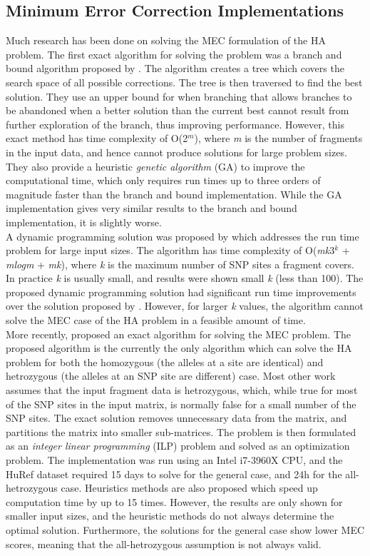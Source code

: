 \documentclass[10pt,twocolumn]{witseiepaper}
\newcommand{\K}{\textit{k }}
\newcommand{\M}{\textit{m }}
\begin{document}
\subsection{ Minimum Error Correction Implementations } \label{sec:mecimp}

Much research has been done on solving the MEC formulation of the HA problem. The first exact algorithm for
solving the problem was a branch and bound algorithm proposed by \cite{wang:2005}. The algorithm creates a
tree which covers the search space of all possible corrections. The tree is then traversed to find the best
solution. They use an upper bound for when branching that allows branches to be abandoned when a better
solution than the current best cannot result from further exploration of the branch, thus improving
performance. However, this exact method has time complexity of O(2$^{\textit{m}}$), where \M is the
number of fragments in the input data, and hence cannot produce solutions for large problem sizes. They also 
provide a heuristic \textit{genetic algorithm} (GA) to improve the computational time, which only requires 
run times up to three orders of magnitude faster than the branch and bound implementation. While the GA
implementation gives very similar results to the branch and bound implementation, it is slightly worse. \\
A dynamic programming solution was proposed by \cite{xie:2008} which addresses the run time problem for large
input sizes. The algorithm has time complexity of O(\textit{mk}3$^{\textit{k}}$ + \textit{mlogm} +
\textit{mk}), where \K is the maximum number of SNP sites a fragment covers. In practice \K is usually small,
and results were shown small \K (less than 100). The proposed dynamic programming solution had significant run
time improvements over the solution proposed by \cite{wang:2005}. However, for larger \K values, the 
algorithm cannot solve the MEC case of the HA problem in a feasible amount of time. \\
More recently, \cite{chen:2013} proposed an exact algorithm for solving the MEC problem. The proposed
algorithm is the currently the only algorithm which can solve the HA problem for both the homozygous (the 
alleles at a site are identical) and hetrozygous (the alleles at an SNP site are different) case. Most other 
work assumes that the input fragment data is hetrozygous, which, while true for most of the SNP sites in the
input matrix, is normally false for a small number of the SNP sites. The exact solution removes unnecessary
data from the matrix, and partitions the matrix into smaller sub-matrices. The problem is then formulated as
an \textit{integer linear programming} (ILP) problem and solved as an optimization problem. The implementation was
run using an Intel i7-3960X CPU, and the HuRef dataset required 15 days to solve for the general case, and 24h
for the all-hetrozygous case. Heuristics methods are also proposed which speed up computation time by up to 15
times. However, the results are only shown for smaller input sizes, and the heuristic methods do not always
determine the optimal solution. Furthermore, the solutions for the general case show lower MEC scores, meaning
that the all-hetrozygous assumption is not always valid. 
\end{document}
